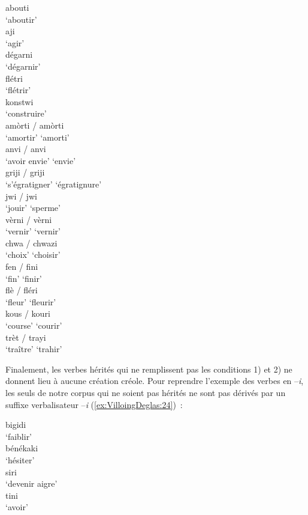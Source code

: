 \documentclass[output=paper]{langsci/langscibook}
\begin{document}
\ea \label{ex:VilloingDeglas:21}
  \ea \gll abouti\\
  {`aboutir'}\\
  \ex \gll aji\\
  {`agir'}\\
  \ex \gll dégarni\\
  {`dégarnir'}\\
  \ex \gll flétri\\
  {`flétrir'}\\
  \ex \gll konstwi\\
  {`construire'}\\
  \z
\ex \label{ex:VilloingDeglas:22}
  \ea \gll amòrti / amòrti\\
  {`amortir'} {} {`amorti'}\\
  \ex \gll anvi / anvi\\
  {`avoir envie'} {} {`envie'}\\
  \ex \gll griji / griji\\
  {`s'égratigner'} {} {`égratignure'}\\
  \ex \gll jwi / jwi\\
  {`jouir'} {} {`sperme'}\\
  \ex \gll vèrni / vèrni\\
  {`vernir'} {} {`vernir'}\\
  \z
\ex \label{ex:VilloingDeglas:23}
  \ea \gll chwa / chwazi\\
  {`choix'} {} {`choisir'}\\
  \ex \gll fen / fini\\
  {`fin'} {} {`finir'}\\
  \ex \gll flè / fléri\\
  {`fleur'} {} {`fleurir'}\\
  \ex \gll kous / kouri\\
  {`course'} {} {`courir'}\\
  \ex \gll trèt / trayi\\
  {`traître'} {} {`trahir'}\\
\z\z

Finalement, les verbes hérités qui ne remplissent pas les conditions 1)
et 2) ne donnent lieu à aucune création créole. Pour reprendre l'exemple
des verbes en --\emph{i}, les seuls de notre corpus qui ne soient pas
hérités ne sont pas dérivés par un suffixe verbalisateur --\emph{i}
(\ref{ex:VilloingDeglas:24})~:

\ea \label{ex:VilloingDeglas:24}
  \ea \gll bigidi\\
  {`faiblir'}\\
  \ex \gll bénékaki\\
  {`hésiter'}\\
  \ex \gll siri\\
  {`devenir aigre'}\\
  \ex \gll tini\\
  {`avoir'}\\
  \z
\z
\end{document}
